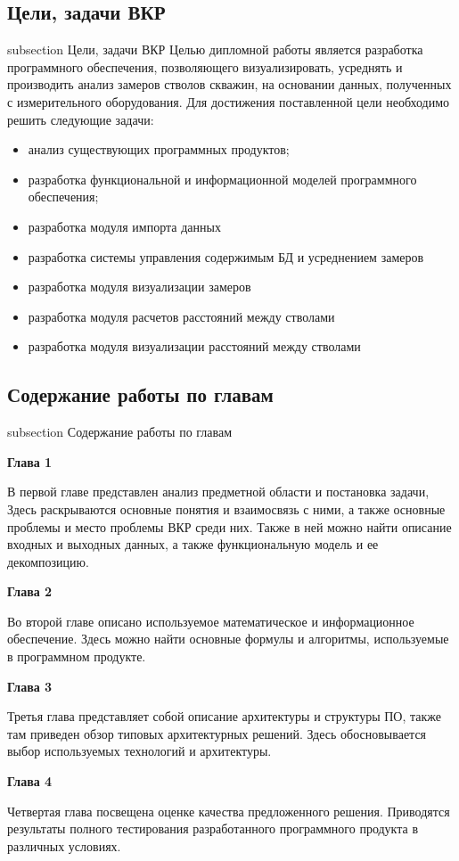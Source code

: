 \subsection*{Цели, задачи ВКР}
 {subsection} {Цели, задачи ВКР}
Целью дипломной работы является разработка программного обеспечения, позволяющего визуализировать, усреднять и производить анализ замеров стволов скважин,
на основании данных, полученных с измерительного оборудования. Для достижения поставленной цели необходимо решить следующие задачи:
\begin{itemize}
  \item анализ существующих программных продуктов;
  \item разработка функциональной и информационной моделей программного обеспечения;
  \item разработка модуля импорта данных
  \item разработка системы управления содержимым БД и усреднением замеров
  \item разработка модуля визуализации замеров
  \item разработка модуля расчетов расстояний между стволами
  \item разработка модуля визуализации расстояний между стволами
\end{itemize}

\subsection*{Содержание работы по главам}
 {subsection} {Содержание работы по главам}

\textbf{Глава 1}

В первой главе представлен анализ предметной области и постановка задачи, Здесь раскрываются основные понятия и взаимосвязь с ними,
а также основные проблемы и место проблемы ВКР среди них. Также в ней можно найти описание входных и выходных данных, а также функциональную модель и
ее декомпозицию.

\textbf{Глава 2}

Во второй главе описано используемое математическое и информационное обеспечение. Здесь можно найти основные формулы и алгоритмы, используемые в
программном продукте.

\textbf{Глава 3}

Третья глава представляет собой описание архитектуры и структуры ПО, также там приведен обзор типовых архитектурных решений. Здесь обосновывается выбор
используемых технологий и архитектуры.

\textbf{Глава 4}

Четвертая глава посвещена оценке качества предложенного решения. Приводятся результаты полного тестирования разработанного
программного продукта в различных условиях.
